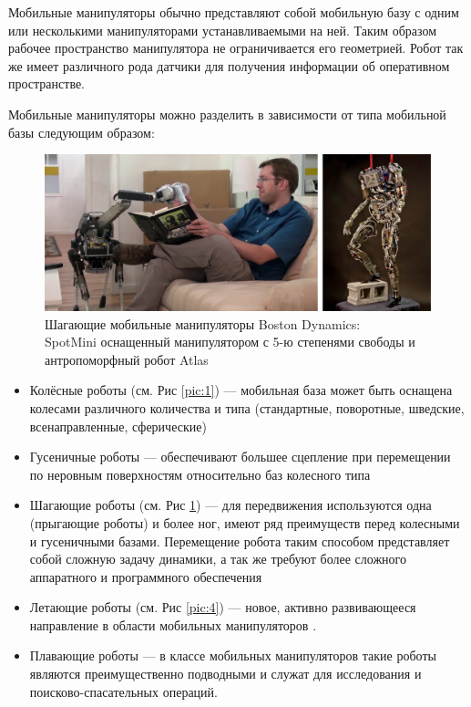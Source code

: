 \documentclass[14pt, a4paper]{extreport}
\begin{document}
Мобильные манипуляторы обычно представляют собой мобильную базу с одним или несколькими манипуляторами устанавливаемыми на ней. Таким образом рабочее пространство манипулятора не ограничивается его геометрией. Робот так же имеет различного рода датчики для получения информации об оперативном пространстве. 

Мобильные манипуляторы можно разделить в зависимости от типа мобильной базы следующим образом:
\newpage
\ \\
\vspace{-5mm}
\begin{figure}[!h]
\centering
\captionsetup{justification=centering}
\renewcommand{\figurename}{Рисунок}
\includegraphics[width=1\textwidth]{darpa.jpg}	%
\caption{Шагающие мобильные манипуляторы Boston Dynamics:\\ SpotMini оснащенный манипулятором с 5-ю степенями свободы и антропоморфный робот Atlas}
\label{pic:3}
\end{figure}
\begin{itemize}
\item Колёсные роботы (см. Рис \ref{pic:1}) --- мобильная база может быть оснащена колесами различного количества и типа (стандартные, поворотные, шведские, всенаправленные, сферические)
\item Гусеничные роботы --- обеспечивают большее сцепление при перемещении по неровным поверхностям относительно баз колесного типа
\item Шагающие роботы (см. Рис \ref{pic:3}) --- для передвижения используются одна (прыгающие роботы) и более ног, имеют ряд преимуществ перед колесными и гусеничными базами. Перемещение робота таким способом представляет собой сложную задачу динамики, а так же требуют более сложного аппаратного и программного обеспечения
\item Летающие роботы (см. Рис \ref{pic:4}) --- новое, активно развивающееся направление в области мобильных манипуляторов \cite{Yang}.
\item Плавающие роботы --- в классе мобильных манипуляторов такие роботы являются преимущественно подводными и служат для исследования и поисково-спасательных операций.
\end{itemize}
\end{document}
